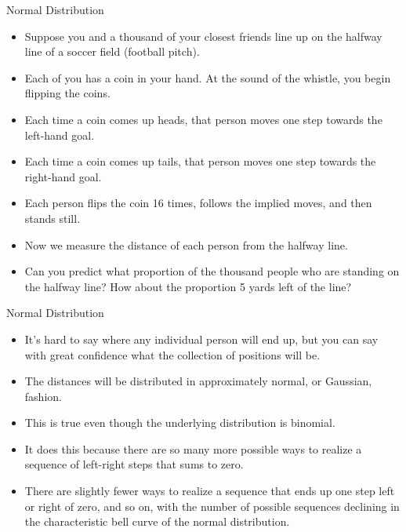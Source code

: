 \documentclass[handout]{beamer}
\begin{document}
\begin{frame}{Normal Distribution}

\scriptsize{
\begin{itemize}
 \item  Suppose you and a thousand of your closest friends line up on the halfway line of a soccer field (football pitch).
 \item Each of you has a coin in your hand. At the sound of the whistle, you begin flipping the coins. 
 \item Each time a coin comes up heads, that person moves one step
towards the left-hand goal. 
\item Each time a coin comes up tails, that person moves one step towards the right-hand goal. 
\item Each person flips the coin 16 times, follows the implied moves,
and then stands still.
\item Now we measure the distance of each person from the halfway line.
\item Can you predict what proportion of the thousand people who are standing on the halfway line? How about the proportion 5 yards left of the line?
 \end{itemize}}
 
 \end{frame}
 
\begin{frame}{Normal Distribution}

\scriptsize{
\begin{itemize}
\item It’s hard to say where any individual person will end up, but you can say with great confidence what the collection of positions will be. 
\item The distances will be distributed in approximately normal, or Gaussian, fashion.
\item This is true even though the underlying distribution is binomial. 
\item It does this because there are so many more possible ways to realize a sequence of left-right steps that sums to zero. 
\item There are slightly fewer ways to realize a sequence that ends
up one step left or right of zero, and so on, with the number of possible sequences declining in the characteristic bell curve of the normal distribution.
 \end{itemize}}
 
 \end{frame}
 
\end{document}
